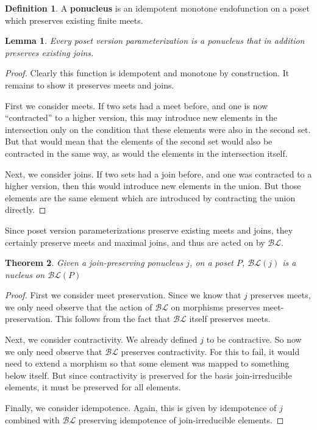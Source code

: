 \documentclass[hoptionsi,review,screen,format=acmsmall]{acmart}
\newtheorem{theorem}{Theorem}[section]
\newtheorem{lemma}[theorem]{Lemma}
\theoremstyle{definition}
\newtheorem{definition}{Definition}[section]
\newcommand{\BLc}{\mathcal{BL}}
\begin{document}
\begin{definition}
A \textbf{ponucleus} is an idempotent monotone endofunction on a poset which preserves existing finite meets.
\end{definition}

\begin{lemma}
Every poset version parameterization is a ponucleus that in addition preserves existing joins.
\end{lemma}

\begin{proof}
Clearly this function is idempotent and monotone by construction. It remains to show it preserves meets and joins.

First we consider meets. If two sets had a meet before, and one is now ``contracted'' to a higher version, this may introduce new elements in the intersection only on the condition that these elements were also in the second set. But that would mean that the elements of the second set would also be contracted in the same way, as would the elements in the intersection itself.

Next, we consider joins. If two sets had a join before, and one was contracted to a higher version, then this would introduce new elements in the union. But those elements are the same element which are introduced by contracting the union directly.
\end{proof}

Since poset version parameterizations preserve existing meets and joins, they certainly preserve meets and maximal joins, and thus are acted on by \(\BLc\).

\begin{theorem}
Given a join-preserving ponucleus \(j\), on a poset \(P\),  \(\BLc(j)\) is a nucleus on \(\BLc(P)\)
\end{theorem}
\begin{proof}
First we consider meet preservation. Since we know that \(j\) preserves meets, we only need observe that the action of \(\BLc\) on morphisms preserves meet-preservation. This follows from the fact that \(\BLc\) itself preserves meets.


Next, we consider contractivity. We already defined \(j\) to be contractive. So now we only need observe that \(\BLc\) preserves contractivity. For this to fail, it would need to extend a morphism so that some element was mapped to something below itself. But since contractivity is preserved for the basis join-irreducible elements, it must be preserved for all elements.

Finally, we consider idempotence. Again, this is given by idempotence of \(j\) combined with \(\BLc\) preserving idempotence of join-irreducible elements.
\end{proof}
\end{document}
